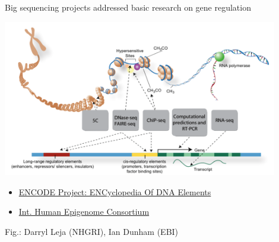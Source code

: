 \documentclass[10pt]{beamer}
\newcommand{\credit}[1]{{\vspace{\fill} \par \raggedleft \scriptsize \mdseries \color{mDarkBrown} #1 \par}}
\begin{document}
\begin{frame}{Big sequencing projects addressed basic research on gene regulation}
	\begin{center}
		\includegraphics[width=0.9\textwidth]{./figures/EncodeNatureGraphic.png}
	\end{center}
    \begin{itemize}
    	\item \href{https://www.encodeproject.org}{ENCODE Project: ENCyclopedia Of DNA Elements}
    	\item \href{http://www.cell.com/consortium/IHEC}{Int. Human Epigenome Consortium}
    \end{itemize}
	\credit{Fig.: Darryl Leja (NHGRI), Ian Dunham (EBI)}
\end{frame}
\end{document}
